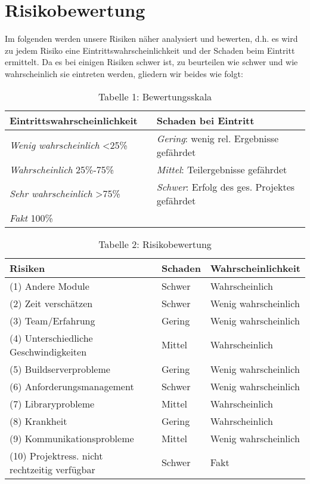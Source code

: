 \section{Risikobewertung}
Im folgenden werden unsere Risiken näher analysiert und bewerten, d.h. es wird zu jedem Risiko eine Eintrittswahrscheinlichkeit und der Schaden beim Eintritt ermittelt.
Da es bei einigen Risiken schwer ist, zu beurteilen wie schwer und wie wahrscheinlich sie eintreten werden, gliedern wir beides wie folgt:

\vspace{2em}

\begin{table}[h]
	\caption*{Tabelle 1: Bewertungsskala}
	\begin{center}
		\begin{tabularx}{\textwidth}{lXl}
			\textbf{Eintrittswahrscheinlichkeit}&&\textbf{Schaden bei Eintritt}\\\hline
			\textit{Wenig wahrscheinlich} <25\%&&\textit{Gering}: wenig rel. Ergebnisse gefährdet\\
			\textit{Wahrscheinlich} 25\%-75\%&&\textit{Mittel}: Teilergebnisse gefährdet\\
			\textit{Sehr wahrscheinlich} >75\%&&\textit{Schwer}: Erfolg des ges. Projektes gefährdet\\
			\textit{Fakt} 100\%&\\\hline
		\end{tabularx}
	\end{center}
\end{table}

\vspace{2em}

\begin{table}[h]
	\caption*{Tabelle 2: Risikobewertung}
	\begin{center}	
		\begin{tabularx}{\textwidth}{lXll}
			\textbf{Risiken}&&\textbf{Schaden}&\textbf{Wahrscheinlichkeit}\\\hline
			(1) Andere Module&&Schwer&Wahrscheinlich\\
			(2) Zeit verschätzen&&Schwer&Wenig wahrscheinlich\\
			(3) Team/Erfahrung&&Gering&Wenig wahrscheinlich\\
			(4) Unterschiedliche Geschwindigkeiten&&Mittel&Wahrscheinlich\\
			(5) Buildserverprobleme&&Gering&Wenig wahrscheinlich\\
			(6) Anforderungsmanagement&&Schwer&Wenig wahrscheinlich\\
			(7) Libraryprobleme&&Mittel&Wahrscheinlich\\
			(8) Krankheit&&Gering&Wahrscheinlich\\
			(9) Kommunikationsprobleme&&Mittel&Wenig wahrscheinlich\\
			(10) Projektress. nicht rechtzeitig verfügbar&&Schwer&Fakt\\\hline
		\end{tabularx}
	\end{center}
\end{table}

